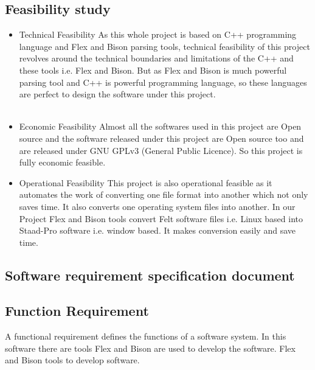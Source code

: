 \subsection{ Feasibility study }
\begin{itemize}
\item Technical Feasibility As this whole project is based on C++ programming language
and Flex and Bison parsing tools, technical feasibility of this project revolves around the
technical boundaries and limitations of the C++ and these tools i.e. Flex and Bison. But as Flex and Bison is much
powerful parsing tool and C++ is powerful programming language, so
these languages are perfect to design the software under this project.\\\\
\item Economic Feasibility Almost all the softwares used in this project are Open source
and the software released under this project are Open source too and are released
under GNU GPLv3 (General Public Licence). So this project is fully economic
feasible.
\item Operational Feasibility This project is also operational feasible as it automates the
work of converting one file format into another which not only saves time. It also converts one operating system files into another. In our Project Flex and Bison tools convert Felt software files i.e. Linux based into Staad-Pro software i.e. window based. It makes conversion easily and save time.
\end{itemize}

\subsection{Software requirement specification document}
\subsection{Function Requirement}
A functional requirement defines the functions of a software system. In this software there
are tools Flex and Bison are used to develop the software. Flex and Bison tools to develop software.

